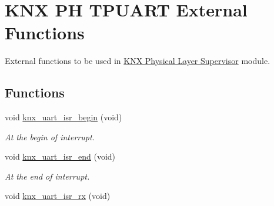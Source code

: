 \hypertarget{group___k_n_x___p_h___t_p_uart___external___functions}{}\section{K\+NX PH T\+P\+U\+A\+RT External Functions}
\label{group___k_n_x___p_h___t_p_uart___external___functions}


External functions to be used in \hyperlink{group___k_n_x___p_h___sup}{K\+NX Physical Layer Supervisor} module.  


\subsection*{Functions}
\begin{DoxyCompactItemize}
\item 
void \hyperlink{group___k_n_x___p_h___t_p_uart___external___functions_gafa12b387b549bde1cd74e212853555cd}{knx\+\_\+uart\+\_\+isr\+\_\+begin} (void)\hypertarget{group___k_n_x___p_h___t_p_uart___external___functions_gafa12b387b549bde1cd74e212853555cd}{}\label{group___k_n_x___p_h___t_p_uart___external___functions_gafa12b387b549bde1cd74e212853555cd}

\begin{DoxyCompactList}\small\item\em At the begin of interrupt. \end{DoxyCompactList}\item 
void \hyperlink{group___k_n_x___p_h___t_p_uart___external___functions_ga64023e4e19c0ab94045d590c0730e758}{knx\+\_\+uart\+\_\+isr\+\_\+end} (void)\hypertarget{group___k_n_x___p_h___t_p_uart___external___functions_ga64023e4e19c0ab94045d590c0730e758}{}\label{group___k_n_x___p_h___t_p_uart___external___functions_ga64023e4e19c0ab94045d590c0730e758}

\begin{DoxyCompactList}\small\item\em At the end of interrupt. \end{DoxyCompactList}\item 
void \hyperlink{group___k_n_x___p_h___t_p_uart___external___functions_ga551e6416873aec386f6bbb391edad6d5}{knx\+\_\+uart\+\_\+isr\+\_\+rx} (void)\hypertarget{group___k_n_x___p_h___t_p_uart___external___functions_ga551e6416873aec386f6bbb391edad6d5}{}\label{group___k_n_x___p_h___t_p_uart___external___functions_ga551e6416873aec386f6bbb391edad6d5}


\end{DoxyCompactItemize}
